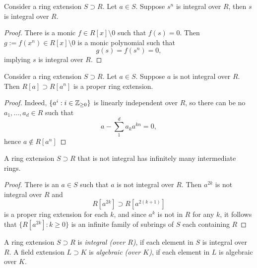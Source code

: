 \begin{proposition}\label{IfAPowerOfAnIntegralElementIsIntegralSoIsTheElementItself}
    Consider a ring extension $S\supset R$. Let $a\in S$. Suppose $s^n$ is integral over $R$, then $s$ is integral over $R$.
\end{proposition}
\begin{proof}
    There is a monic $f\in R[x]\setminus 0$ such that $f(s) = 0$. Then $g:=f(x^n)\in R[x]\setminus 0$ is a monic polynomial such that 
    $$
        g(s) = f(s^n)= 0,  
    $$
    implying $s$ is integral over $R$. 
\end{proof}
\begin{proposition}\label{ExistenceOfProperRingExtensionWhenNonIntegralELementExists}
    Consider a ring extension $S\supset R$. Let $a\in S$. Suppose $a$ is not integral over $R$. Then $R[a]\supset R[a^n]$ is a proper ring extension. 
\end{proposition}
\begin{proof}
    Indeed, $\{a^i : i\in \mathbb{Z}_{\geq0}\}$ is linearly independent over $R$, so there can be no $a_1,\dots,a_d\in R$ such that 
    $$
        a-\sum_1^d a_k a^{kn} = 0,
    $$
    hence $a\notin R[a^n]$
\end{proof}
\begin{corollary}
    A ring extension $S\supset R$ that is not integral has infinitely many intermediate rings. 
\end{corollary}
\begin{proof}
    There is an $a\in S$ such that $a$ is not integral over $R$. Then $a^{2k}$ is not integral over $R$ and 
    $$
        R[a^{2k}]\supset R[a^{2(k+1)}]
    $$
    is a proper ring extension for each $k$, and since $a^k$ is not in $R$ for any $k$, it follows that $\{R[a^{2k}] : k\geq 0\}$ is an infinite family of subrings of $S$ each containing $R$
\end{proof}
\begin{definition}
    A ring extension $S\supset R$ is \emph{integral (over $R$)}, if each element in $S$ is integral over $R$. A field extension $L\supset K$ is \emph{algebraic (over $K$)}, if each element in $L$ is algebraic over $K$.  
\end{definition}
